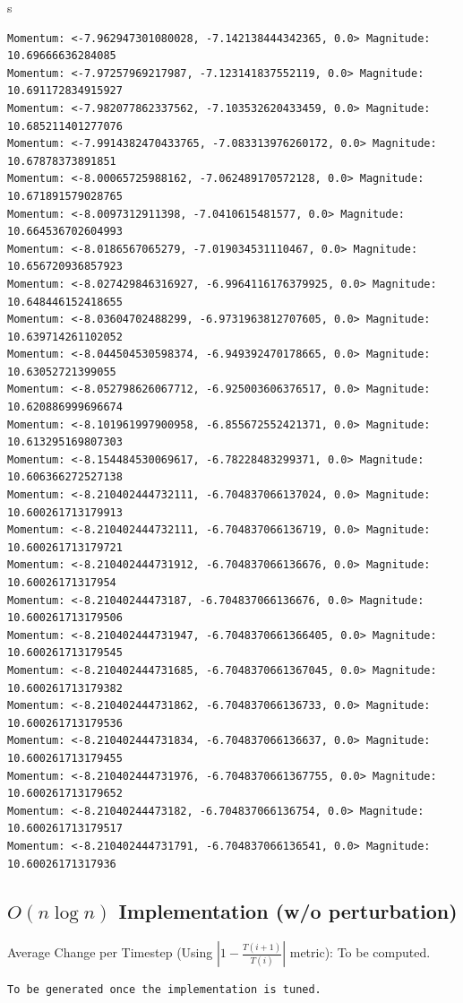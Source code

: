s\documentclass[10pt]{article}
\begin{document}
\begin{verbatim}
Momentum: <-7.962947301080028, -7.142138444342365, 0.0> Magnitude: 10.69666636284085
Momentum: <-7.97257969217987, -7.123141837552119, 0.0> Magnitude: 10.691172834915927
Momentum: <-7.982077862337562, -7.103532620433459, 0.0> Magnitude: 10.685211401277076
Momentum: <-7.9914382470433765, -7.083313976260172, 0.0> Magnitude: 10.67878373891851
Momentum: <-8.00065725988162, -7.062489170572128, 0.0> Magnitude: 10.671891579028765
Momentum: <-8.0097312911398, -7.0410615481577, 0.0> Magnitude: 10.664536702604993
Momentum: <-8.0186567065279, -7.019034531110467, 0.0> Magnitude: 10.656720936857923
Momentum: <-8.027429846316927, -6.9964116176379925, 0.0> Magnitude: 10.648446152418655
Momentum: <-8.03604702488299, -6.9731963812707605, 0.0> Magnitude: 10.639714261102052
Momentum: <-8.044504530598374, -6.949392470178665, 0.0> Magnitude: 10.63052721399055
Momentum: <-8.052798626067712, -6.925003606376517, 0.0> Magnitude: 10.620886999696674
Momentum: <-8.101961997900958, -6.855672552421371, 0.0> Magnitude: 10.613295169807303
Momentum: <-8.154484530069617, -6.78228483299371, 0.0> Magnitude: 10.606366272527138
Momentum: <-8.210402444732111, -6.704837066137024, 0.0> Magnitude: 10.600261713179913
Momentum: <-8.210402444732111, -6.704837066136719, 0.0> Magnitude: 10.600261713179721
Momentum: <-8.210402444731912, -6.704837066136676, 0.0> Magnitude: 10.60026171317954
Momentum: <-8.21040244473187, -6.704837066136676, 0.0> Magnitude: 10.600261713179506
Momentum: <-8.210402444731947, -6.7048370661366405, 0.0> Magnitude: 10.600261713179545
Momentum: <-8.210402444731685, -6.7048370661367045, 0.0> Magnitude: 10.600261713179382
Momentum: <-8.210402444731862, -6.704837066136733, 0.0> Magnitude: 10.600261713179536
Momentum: <-8.210402444731834, -6.704837066136637, 0.0> Magnitude: 10.600261713179455
Momentum: <-8.210402444731976, -6.7048370661367755, 0.0> Magnitude: 10.600261713179652
Momentum: <-8.21040244473182, -6.704837066136754, 0.0> Magnitude: 10.600261713179517
Momentum: <-8.210402444731791, -6.704837066136541, 0.0> Magnitude: 10.60026171317936
\end{verbatim}
\small
\clearpage


\subsection{$O(n \log n)$ Implementation (w/o perturbation)}
Average Change per Timestep (Using $|1 - \frac{T(i+1)}{T(i)}|$ metric): To be computed.
\footnotesize
\begin{verbatim}
To be generated once the implementation is tuned.
\end{verbatim}
\small
\end{document}

